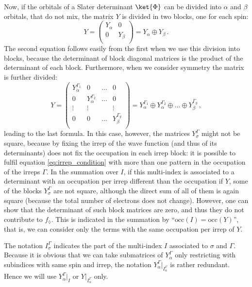 \documentclass[a4paper,11pt]{article}
\begin{document}
Now, if the orbitals of a Slater determinant $\ket{\Phi}$ can be divided into $\alpha$ and $\beta$ orbitals, that do not mix, the matrix $Y$ is divided in two blocks, one for each spin:
\begin{equation}
  Y =
  \begin{pmatrix}
    Y_\alpha & 0\\
    0 & Y_\beta\\
  \end{pmatrix}
  = Y_\alpha \oplus Y_\beta\,.
\end{equation}
The second equation follows easily from the first when we use this division into blocks, because the determinant of block diagonal matrices is the product of the determinant of each block.
Furthermore, when we consider symmetry the matrix is further divided:
\begin{equation}\label{eq:Y_spin_irrep_blocks}
  Y =
  \begin{pmatrix}
    Y_\alpha^{\Gamma_1} & 0 & ... & 0\\
    0 & Y_\alpha^{\Gamma_2} & ... & 0 \\
    \vdots & \vdots & & \vdots\\
    0 & 0 &\dots & Y_\beta^{\Gamma_g}\\
  \end{pmatrix}
  = Y_\alpha^{\Gamma_1} \oplus Y_\alpha^{\Gamma_2} \oplus \dots \oplus Y_\beta^{\Gamma_g}\,,
\end{equation}
leading to the last formula.
In this case, however, the matrices $Y_\sigma^\Gamma$ might not be square, because by fixing the irrep of the wave function (and thus of its determinants) does not fix the occupation in each irrep block:
it is possible to fulfil equation \ref{eq:irrep_condition} with more than one pattern in the occupation of the irreps $\Gamma$.
In the summation over $I$, if this multi-index is associated to a determinant with an occupation per irrep different than the occupation if $Y$, some of the blocks $Y_\sigma^{\Gamma}$ are not square, although the direct sum of all of them is again square (because the total number of electrons does not change).
However, one can show that the determinant of such block matrices are zero, and thus they do not contribute to $f_\lozenge$.
This is indicated in the summation by ``$\text{occ}(I) = \text{occ}(Y)$'', that is, we can consider only the terms with the same occupation per irrep of $Y$.

The notation $I_\sigma^\Gamma$ indicates the part of the multi-index $I$ associated to $\sigma$ and $\Gamma$.
Because it is obvious that we can take submatrices of $Y_\alpha^\Gamma$ only restricting with subindices with same spin and irrep, the notation $Y_\alpha^\Gamma\big|_{I_\alpha^\Gamma}$ is rather redundant.
Hence we will use $Y_\alpha^\Gamma\big|_{I}$ or $Y\big|_{I_\alpha^\Gamma}$ only.
\end{document}
